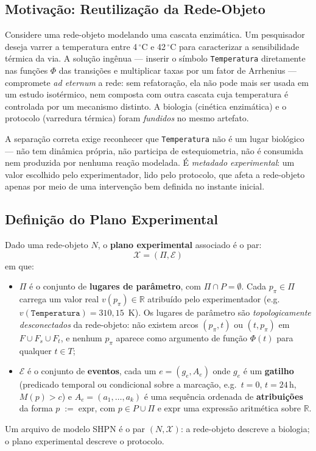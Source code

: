 \subsection{Motivação: Reutilização da Rede-Objeto}
\label{subsec:motivacao-plano}

Considere uma rede-objeto modelando uma cascata enzimática. Um pesquisador
deseja varrer a temperatura entre 4\,$^{\circ}$C e 42\,$^{\circ}$C para
caracterizar a sensibilidade térmica da via. A solução ingênua --- inserir o
símbolo \texttt{Temperatura} diretamente nas funções $\Phi$ das transições e
multiplicar taxas por um fator de Arrhenius --- compromete \emph{ad eternum}
a rede: sem refatoração, ela não pode mais ser usada em um estudo isotérmico,
nem composta com outra cascata cuja temperatura é controlada por um mecanismo
distinto. A biologia (cinética enzimática) e o protocolo (varredura térmica)
foram \emph{fundidos} no mesmo artefato.

A separação correta exige reconhecer que \texttt{Temperatura} não é um lugar
biológico --- não tem dinâmica própria, não participa de estequiometria, não
é consumida nem produzida por nenhuma reação modelada. É \emph{metadado
experimental}: um valor escolhido pelo experimentador, lido pelo protocolo,
que afeta a rede-objeto apenas por meio de uma intervenção bem definida no
instante inicial.

\subsection{Definição do Plano Experimental}
\label{subsec:definicao-plano}

\begin{definition}
\label{def:plano-experimental}
Dado uma rede-objeto $N$, o \textbf{plano experimental} associado é o par:
\[
\mathcal{X} = (\Pi, \mathcal{E})
\]
em que:
\begin{itemize}
  \item $\Pi$ é o conjunto de \textbf{lugares de parâmetro}, com
        $\Pi \cap P = \emptyset$. Cada $p_\pi \in \Pi$ carrega um valor real
        $v(p_\pi) \in \mathbb{R}$ atribuído pelo experimentador (e.g.\
        $v(\texttt{Temperatura}) = 310{,}15$~K). Os lugares de parâmetro são
        \emph{topologicamente desconectados} da rede-objeto: não existem
        arcos $(p_\pi, t)$ ou $(t, p_\pi)$ em $F \cup F_s \cup F_t$, e nenhum
        $p_\pi$ aparece como argumento de função $\Phi(t)$ para qualquer
        $t \in T$;
  \item $\mathcal{E}$ é o conjunto de \textbf{eventos}, cada um
        $e = (g_e, A_e)$ onde $g_e$ é um \textbf{gatilho} (predicado temporal
        ou condicional sobre a marcação, e.g.\ $t = 0$, $t = 24\,\text{h}$,
        $M(p) > c$) e $A_e = (a_1, \ldots, a_k)$ é uma sequência ordenada
        de \textbf{atribuições} da forma $p \;{:=}\; \text{expr}$, com
        $p \in P \cup \Pi$ e $\text{expr}$ uma expressão aritmética sobre
        $\mathbb{R}$.
\end{itemize}
Um arquivo de modelo SHPN é o par $(N, \mathcal{X})$: a rede-objeto descreve a
biologia; o plano experimental descreve o protocolo.
\end{definition}

